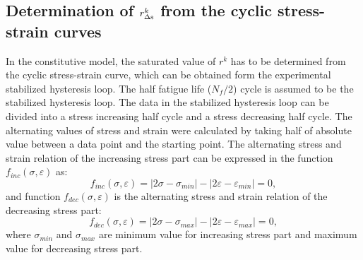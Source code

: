 \subsection{Determination of $r_{\Delta \rm{s}}^k$ from the cyclic stress-strain curves}
In the constitutive model, the saturated value of $r^k$ has to be determined from the cyclic stress-strain curve, which can be obtained form the experimental stabilized hysteresis loop.
The half fatigue life ($N_f/2$) cycle is assumed to be the stabilized hysteresis loop.
The data in the stabilized hysteresis loop can be divided into a stress increasing half cycle and a stress decreasing half cycle.
The alternating values of stress and strain were calculated by taking half of absolute value between a data point and the starting point.
The alternating stress and strain relation of the increasing stress part can be expressed in the function $f_{inc}(\sigma,\varepsilon)$ as:
\begin{equation}
f_{inc}(\sigma,\varepsilon)=|2\sigma-\sigma_{min}|-|2\varepsilon-\varepsilon_{min}|=0,
\end{equation}
and function $f_{dec}(\sigma,\varepsilon)$ is the alternating stress and strain relation of the decreasing stress part:
\begin{equation}
f_{dec}(\sigma,\varepsilon)=|2\sigma-\sigma_{max}|-|2\varepsilon-\varepsilon_{max}|=0,
\end{equation}
where $\sigma_{min}$ and $\sigma_{max}$ are minimum value for increasing stress part and maximum value for decreasing stress part.

